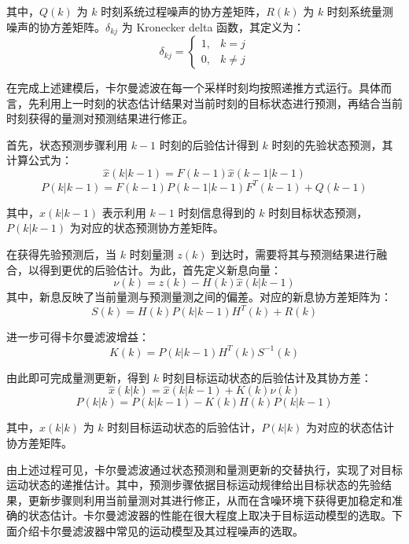 \documentclass{xdupgthesis}
\begin{document}
其中，$Q(k)$ 为 $k$ 时刻系统过程噪声的协方差矩阵，$R(k)$ 为 $k$ 时刻系统量测噪声的协方差矩阵。$\delta_{kj}$ 为 Kronecker delta 函数，其定义为：
\begin{equation}
	\delta_{kj}=
	\begin{cases}
		1, & k=j\\
		0, & k\neq j
	\end{cases}
\end{equation}

在完成上述建模后，卡尔曼滤波在每一个采样时刻均按照递推方式运行。具体而言，先利用上一时刻的状态估计结果对当前时刻的目标状态进行预测，再结合当前时刻获得的量测对预测结果进行修正。

首先，状态预测步骤利用 $k-1$ 时刻的后验估计得到 $k$ 时刻的先验状态预测，其计算公式为：
\begin{equation}
	\hat{x}(k|k-1)=F(k-1)\hat{x}(k-1|k-1)
\end{equation}
\begin{equation}
	P(k|k-1)=F(k-1)P(k-1|k-1)F^{T}(k-1)+Q(k-1)
\end{equation}

其中，$\hat{x}(k|k-1)$ 表示利用 $k-1$ 时刻信息得到的 $k$ 时刻目标状态预测，$P(k|k-1)$ 为对应的状态预测协方差矩阵。

在获得先验预测后，当 $k$ 时刻量测 $z(k)$ 到达时，需要将其与预测结果进行融合，以得到更优的后验估计。为此，首先定义新息向量：
\begin{equation}
	\nu(k)=z(k)-H(k)\hat{x}(k|k-1)
\end{equation}
其中，新息反映了当前量测与预测量测之间的偏差。对应的新息协方差矩阵为：
\begin{equation}
	S(k)=H(k)P(k|k-1)H^{T}(k)+R(k)
\end{equation}

进一步可得卡尔曼滤波增益：
\begin{equation}
	K(k)=P(k|k-1)H^{T}(k)S^{-1}(k)
\end{equation}

由此即可完成量测更新，得到 $k$ 时刻目标运动状态的后验估计及其协方差：
\begin{equation}
	\hat{x}(k|k)=\hat{x}(k|k-1)+K(k)\nu(k)
\end{equation}
\begin{equation}
	P(k|k)=P(k|k-1)-K(k)H(k)P(k|k-1)
\end{equation}

其中，$\hat{x}(k|k)$ 为 $k$ 时刻目标运动状态的后验估计，$P(k|k)$ 为对应的状态估计协方差矩阵。

由上述过程可见，卡尔曼滤波通过状态预测和量测更新的交替执行，实现了对目标运动状态的递推估计。其中，预测步骤依据目标运动规律给出目标状态的先验结果，更新步骤则利用当前量测对其进行修正，从而在含噪环境下获得更加稳定和准确的状态估计。卡尔曼滤波器的性能在很大程度上取决于目标运动模型的选取。下面介绍卡尔曼滤波器中常见的运动模型及其过程噪声的选取。
\end{document}
